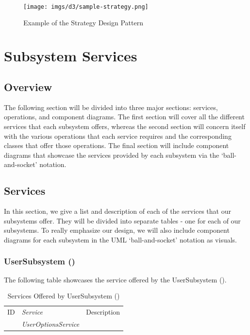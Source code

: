 \documentclass[12pt,letterpaper]{article}
\begin{document}
\begin{figure}[H]
	\centering{}
	\texttt{[image: imgs/d3/sample-strategy.png]}
	\caption{Example of the Strategy Design Pattern}
\end{figure}

\section{Subsystem Services}
\subsection{Overview}

The following section will be divided into three major sections: services, operations, and component diagrams. The first section will cover all the different services that each subsystem offers, whereas the second section will concern itself with the various operations that each service requires and the corresponding classes that offer those operations. The final section will include component diagrams that showcase the services provided by each subsystem via the `ball-and-socket' notation.

\subsection{Services}

In this section, we give a list and description of each of the services that our subsystems offer. They will be divided into separate tables - one for each of our subsystems. To really emphasize our design, we will also include component diagrams for each subsystem in the UML `ball-and-socket' notation as visuals.

\subsubsection{UserSubsystem ()}

\noindent{}
The following table showcases the service offered by the UserSubsystem ().

\begin{table}[H]
	\caption{Services Offered by UserSubsystem ()} 
	\begin{tabu} to 
		\tableheader{}ID & Service & Description\\
		 & UserOptionsService & \\
	\end{tabu}
\end{table}
\end{document}
